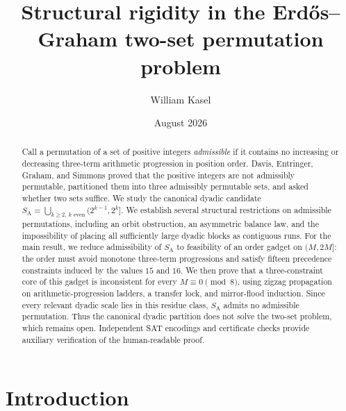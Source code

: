 \documentclass[11pt]{article}
\title{Structural rigidity in the Erd\H{o}s--Graham two-set permutation problem}
\author{William Kasel}
\date{August 2026}
\theoremstyle{definition}
\newcommand{\SA}{S_{\mathrm{A}}}
\begin{document}
\maketitle

\begin{abstract}
Call a permutation of a set of positive integers \emph{admissible} if it
contains no increasing or decreasing three-term arithmetic progression in
position order. Davis, Entringer, Graham, and Simmons proved that the
positive integers are not admissibly permutable, partitioned them into
three admissibly permutable sets, and asked whether two sets suffice. We
study the canonical dyadic candidate
$\SA = \bigcup_{k \ge 2,\ k \text{ even}} (2^{k-1}, 2^{k}]$. We establish
several structural restrictions on admissible permutations, including an
orbit obstruction, an asymmetric balance law, and the impossibility of
placing all sufficiently large dyadic blocks as contiguous runs. For the
main result, we reduce admissibility of $\SA$ to feasibility of an order
gadget on $(M, 2M]$: the order must avoid monotone three-term progressions
and satisfy fifteen precedence constraints induced by the values $15$ and
$16$. We then prove that a three-constraint core of this gadget is
inconsistent for every $M \equiv 0 \pmod 8$, using zigzag propagation on
arithmetic-progression ladders, a transfer lock, and mirror-flood
induction. Since every relevant dyadic scale lies in this residue class,
$\SA$ admits no admissible permutation. Thus the canonical dyadic partition
does not solve the two-set problem, which remains open. Independent SAT
encodings and certificate checks provide auxiliary verification of the
human-readable proof.
\end{abstract}

\section{Introduction}
\end{document}
